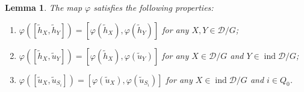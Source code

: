 \documentclass[12pt,reqno]{amsart}
\numberwithin{equation}{section}
\newtheorem{lemma}[theorem]{Lemma}
\begin{document}
	\begin{lemma}\label{lem:property-varphi}
		The map $\varphi$ satisfies the following properties:
		\begin{enumerate}
			\item $\varphi([\tilde{h}_X,\tilde{h}_Y])=[\varphi(\tilde{h}_X),\varphi(\tilde{h}_Y)]$ for any $X,Y\in \mathcal{D}/G$;
			\item $\varphi([\tilde{h}_X,\tilde{u}_Y])=[\varphi(\tilde{h}_X),\varphi(\tilde{u}_Y)]$ for any $X\in \mathcal{D}/G$ and $Y\in \operatorname{ind} \mathcal{D}/G$;
			\item $\varphi([\tilde{u}_X,\tilde{u}_{S_i}])=[\varphi(\tilde{u}_X),\varphi(\tilde{u}_{S_i})]$ for any $X\in \operatorname{ind} \mathcal{D}/G$ and $i\in Q_0$.
		\end{enumerate}
	\end{lemma}
\end{document}
